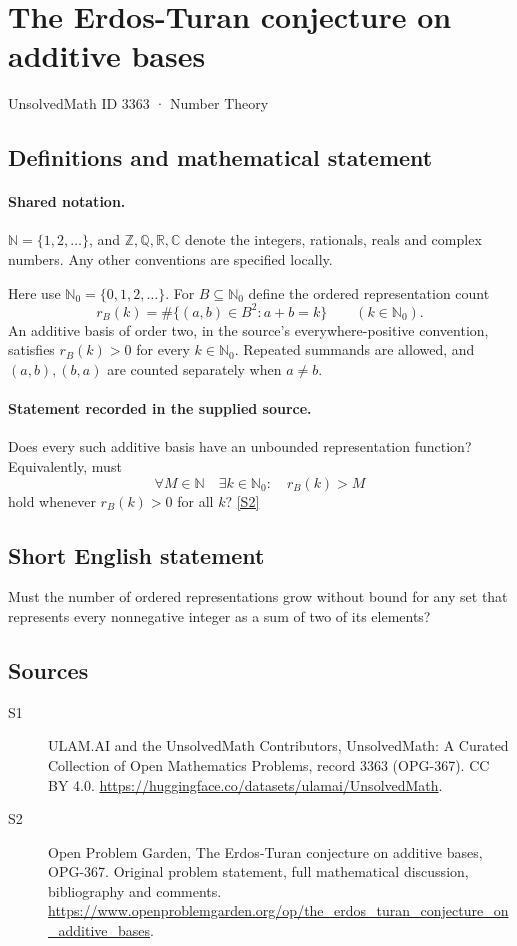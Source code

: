 \documentclass[11pt]{article}
\newcommand{\sref}[2]{\hyperlink{source:#1:#2}{[S#2]}}
\begin{document}
\setcounter{section}{3362}
\section{The Erdos-Turan conjecture on additive bases}\label{3363}
{\small\sffamily UnsolvedMath ID 3363 · Number Theory}
\subsection{Definitions and mathematical statement}

\paragraph{Shared notation.}$\mathbb N=\{1,2,\ldots\}$, and $\mathbb Z,\mathbb Q,\mathbb R,\mathbb C$ denote the integers, rationals, reals and complex numbers. Any other conventions are specified locally.


Here use $\mathbb N_0=\{0,1,2,\ldots\}$. For $B\subseteq\mathbb N_0$ define the ordered representation count
\[
 r_B(k)=\#\{(a,b)\in B^2:a+b=k\}\qquad(k\in\mathbb N_0).
\]
An additive basis of order two, in the source's everywhere-positive convention, satisfies $r_B(k)>0$ for every $k\in\mathbb N_0$. Repeated summands are allowed, and $(a,b),(b,a)$ are counted separately when $a\ne b$.
\paragraph{Statement recorded in the supplied source.}
Does every such additive basis have an unbounded representation function? Equivalently, must
\[
 \forall M\in\mathbb N\quad\exists k\in\mathbb N_0:\quad r_B(k)>M
\]
hold whenever $r_B(k)>0$ for all $k$? \sref{3363}{2}
\subsection{Short English statement}
Must the number of ordered representations grow without bound for any set that represents every nonnegative integer as a sum of two of its elements?
\subsection{Sources}
\begin{description}
\item[\hypertarget{source:3363:1}{S1}] ULAM.AI and the UnsolvedMath Contributors, UnsolvedMath: A Curated Collection of Open Mathematics Problems, record 3363 (OPG-367). CC BY 4.0. \url{https://huggingface.co/datasets/ulamai/UnsolvedMath}.
\item[\hypertarget{source:3363:2}{S2}] Open Problem Garden, The Erdos-Turan conjecture on additive bases, OPG-367. Original problem statement, full mathematical discussion, bibliography and comments. \url{https://www.openproblemgarden.org/op/the_erdos_turan_conjecture_on_additive_bases}.
\end{description}
\label{end:3363}
\end{document}
